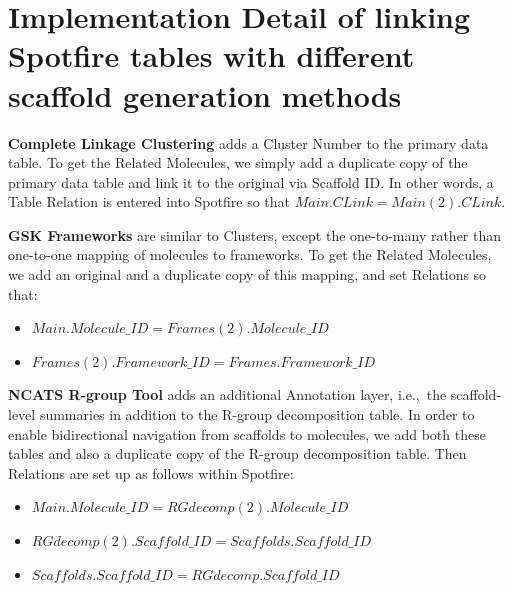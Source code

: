 \documentclass[11pt,letterpaper,biochem]{article}
\newcommand*\ie{i.e.,~}
\begin{document}
%



\newpage 

\section{Implementation Detail of linking Spotfire tables with different scaffold generation methods}
\label{sec:scaf-table-spotfire}

{\bf Complete Linkage Clustering} adds a Cluster Number to the primary data table. To get the Related Molecules, we simply add a duplicate copy of the primary data table and link it to the original via Scaffold ID. In other words, a Table Relation is entered into Spotfire so that $Main.CLink = Main(2).CLink$.  

{\bf GSK Frameworks} are similar to Clusters, except the one-to-many rather than one-to-one mapping of molecules to frameworks. To get the Related Molecules, we add an original and a duplicate copy of this mapping, and set Relations so that:  
\begin{itemize}
\item $Main.Molecule\_ID = Frames(2).Molecule\_ID$
\item $Frames(2).Framework\_ID = Frames.Framework\_ID$
\end{itemize}

{\bf NCATS R-group Tool} adds an additional Annotation layer, \ie the
scaffold-level summaries in addition to the R-group decomposition
table. In order to enable bidirectional navigation from scaffolds to
molecules, we add both these tables and also a duplicate copy of the
R-group decomposition table. Then Relations are set up as follows
within Spotfire:
\begin{itemize}
\item $Main.Molecule\_ID = RGdecomp(2).Molecule\_ID$
\item $RGdecomp(2).Scaffold\_ID = Scaffolds.Scaffold\_ID$
\item $Scaffolds.Scaffold\_ID = RGdecomp.Scaffold\_ID$
\end{itemize}   
\end{document}
